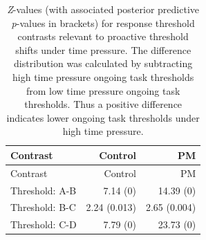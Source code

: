\documentclass[11pt,]{article}
\begin{document}
\begin{longtable}[]{@{}lrr@{}}
\caption{\emph{Z}-values (with associated posterior predictive
\emph{p}-values in brackets) for response threshold contrasts relevant
to proactive threshold shifts under time pressure. The difference
distribution was calculated by subtracting high time pressure ongoing
task thresholds from low time pressure ongoing task thresholds. Thus a
positive difference indicates lower ongoing task thresholds under high
time pressure.}\tabularnewline
\toprule
\begin{minipage}[b]{0.19\columnwidth}\raggedright\strut
Contrast\strut
\end{minipage} & \begin{minipage}[b]{0.16\columnwidth}\raggedleft\strut
Control\strut
\end{minipage} & \begin{minipage}[b]{0.16\columnwidth}\raggedleft\strut
PM\strut
\end{minipage}\tabularnewline
\midrule
\endfirsthead
\toprule
\begin{minipage}[b]{0.19\columnwidth}\raggedright\strut
Contrast\strut
\end{minipage} & \begin{minipage}[b]{0.16\columnwidth}\raggedleft\strut
Control\strut
\end{minipage} & \begin{minipage}[b]{0.16\columnwidth}\raggedleft\strut
PM\strut
\end{minipage}\tabularnewline
\midrule
\endhead
\begin{minipage}[t]{0.19\columnwidth}\raggedright\strut
Threshold: A-B\strut
\end{minipage} & \begin{minipage}[t]{0.16\columnwidth}\raggedleft\strut
7.14 (0)\strut
\end{minipage} & \begin{minipage}[t]{0.16\columnwidth}\raggedleft\strut
14.39 (0)\strut
\end{minipage}\tabularnewline
\begin{minipage}[t]{0.19\columnwidth}\raggedright\strut
Threshold: B-C\strut
\end{minipage} & \begin{minipage}[t]{0.16\columnwidth}\raggedleft\strut
2.24 (0.013)\strut
\end{minipage} & \begin{minipage}[t]{0.16\columnwidth}\raggedleft\strut
2.65 (0.004)\strut
\end{minipage}\tabularnewline
\begin{minipage}[t]{0.19\columnwidth}\raggedright\strut
Threshold: C-D\strut
\end{minipage} & \begin{minipage}[t]{0.16\columnwidth}\raggedleft\strut
7.79 (0)\strut
\end{minipage} & \begin{minipage}[t]{0.16\columnwidth}\raggedleft\strut
23.73 (0)\strut
\end{minipage}\tabularnewline
\bottomrule
\end{longtable}
\end{document}
